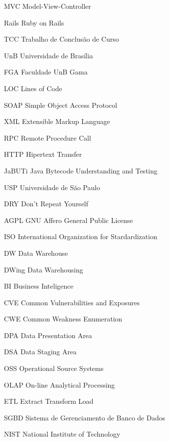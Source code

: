 \begin{siglas}
  
  \item[MVC] Model-View-Controller
  \item[Rails] Ruby on Rails
  \item[TCC] Trabalho de Conclusão de Curso
  \item[UnB] Universidade de Brasília
  \item[FGA] Faculdade UnB Gama
  \item[LOC] Lines of Code
  \item[SOAP] Simple Object Access Protocol
  \item[XML] Extensible Markup Language
  \item[RPC] Remote Procedure Call
  \item[HTTP] Hipertext Transfer
  \item[JaBUTi] Java Bytecode Understanding and Testing
  \item[USP] Universidade de São Paulo
  \item[DRY] Don't Repeat Yourself
  \item[AGPL] GNU Affero General Public License
  \item[ISO] International Organization for Stardardization
  \item[DW] Data Warehouse
  \item[DWing] Data Warehousing
  \item[BI] Business Inteligence
  \item[CVE] Common Vulnerabilities and Exposures
  \item[CWE] Common Weakness Enumeration
  \item[DPA] Data Presentation Area
  \item[DSA] Data Staging Area
  \item[OSS] Operational Source Systems
  \item[OLAP] On-line Analytical Processing
  \item[ETL] Extract Transform Load
  \item[SGBD] Sistema de Gerenciamento de Banco de Dados
  \item[NIST] National Institute of Technology


  
\end{siglas}

